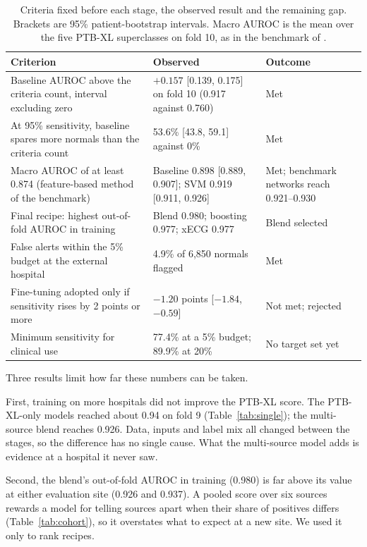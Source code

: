 \documentclass[letterpaper,11pt]{article}
\begin{document}
\begin{table}[!htb]
  \centering
  \caption{Criteria fixed before each stage, the observed result and the remaining gap. Brackets are 95\% patient-bootstrap intervals. Macro AUROC is the mean over the five PTB-XL superclasses on fold 10, as in the benchmark of \textcite{strodthoff2021deep}.}
  \label{tab:criteria}
  \small
  \begin{tabular}{p{5.6cm}p{5.6cm}p{4.0cm}}
    \toprule
    Criterion & Observed & Outcome \\
    \midrule
    Baseline AUROC above the criteria count, interval excluding zero & $+0.157$ [0.139, 0.175] on fold 10 (0.917 against 0.760) & Met \\
    At 95\% sensitivity, baseline spares more normals than the criteria count & 53.6\% [43.8, 59.1] against 0\% & Met \\
    Macro AUROC of at least 0.874 (feature-based method of the benchmark) & Baseline 0.898 [0.889, 0.907]; SVM 0.919 [0.911, 0.926] & Met; benchmark networks reach 0.921--0.930 \\
    Final recipe: highest out-of-fold AUROC in training & Blend 0.980; boosting 0.977; xECG 0.977 & Blend selected \\
    False alerts within the 5\% budget at the external hospital & 4.9\% of 6,850 normals flagged & Met \\
    Fine-tuning adopted only if sensitivity rises by 2 points or more & $-1.20$ points [$-1.84$, $-0.59$] & Not met; rejected \\
    Minimum sensitivity for clinical use & 77.4\% at a 5\% budget; 89.9\% at 20\% & No target set yet \\
    \bottomrule
  \end{tabular}
\end{table}

Three results limit how far these numbers can be taken.

First, training on more hospitals did not improve the PTB-XL score. The PTB-XL-only models reached about 0.94 on fold 9 (Table~\ref{tab:single}); the multi-source blend reaches 0.926. Data, inputs and label mix all changed between the stages, so the difference has no single cause. What the multi-source model adds is evidence at a hospital it never saw.

Second, the blend's out-of-fold AUROC in training (0.980) is far above its value at either evaluation site (0.926 and 0.937). A pooled score over six sources rewards a model for telling sources apart when their share of positives differs (Table~\ref{tab:cohort}), so it overstates what to expect at a new site. We used it only to rank recipes.
\end{document}
